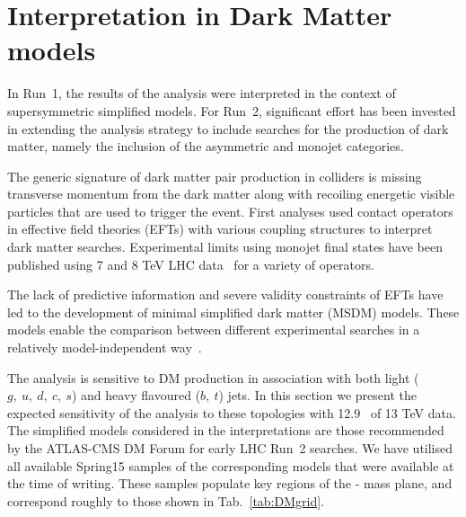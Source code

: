 \section{Interpretation in Dark Matter models} \label{sec:darkmatter}

In Run~1, the results of the \alphat analysis were interpreted in the context of
supersymmetric simplified models. For Run~2, significant effort has been invested
in extending the analysis strategy to include searches for the production of dark
matter, namely the inclusion of the asymmetric and monojet categories.

The generic signature of dark matter pair production in colliders is missing
transverse momentum from the dark matter along with recoiling energetic visible
particles that are used to trigger the event. First analyses used contact 
operators~\cite{Goodman:2010ku} in effective field theories (EFTs) with various 
coupling structures to interpret dark matter searches. Experimental limits using
monojet final states have been published using 7 and 8 TeV LHC 
data~\cite{Chatrchyan:2012me,ATLAS:2012ky} for a variety of operators.


The lack of predictive information and severe validity constraints of EFTs have
led to the development of minimal simplified dark matter (MSDM) models.
These models enable the comparison between different experimental
searches in a relatively model-independent way~\cite{Buchmueller:2014yoa}.


The \alphat analysis is sensitive to DM production in association with both
light ($g,~u,~d,~c,~s$) and heavy flavoured ($b,~t$) jets. In this section we
present the expected sensitivity of the analysis to these topologies with 12.9~\ifb
of 13 TeV data. The simplified models considered in the interpretations are those
recommended by the ATLAS-CMS DM Forum for early LHC Run~2 searches. We have
utilised all available Spring15 samples of the corresponding models that were
available at the time of writing. These samples populate key regions of the
{\mphi-\mchi} mass plane, and correspond roughly to those shown in
Tab.~\ref{tab:DMgrid}.

